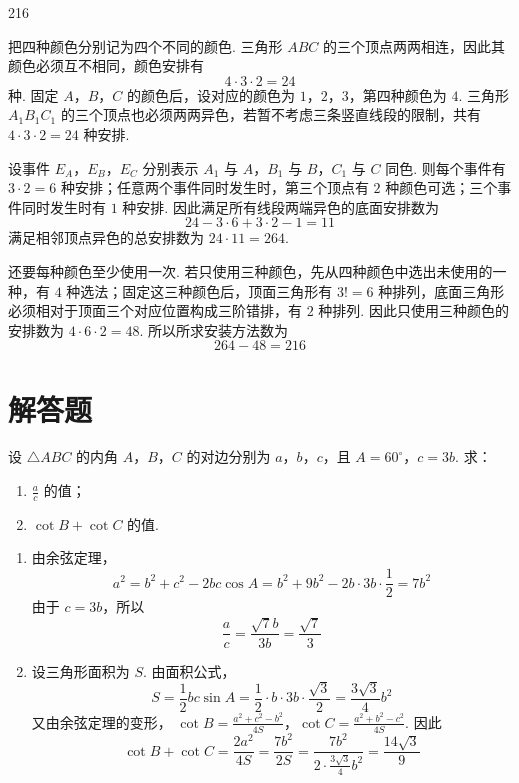 \begin{answer}
216
\end{answer}

\begin{solution}
把四种颜色分别记为四个不同的颜色. 三角形 \(ABC\) 的三个顶点两两相连，因此其颜色必须互不相同，颜色安排有
\[
4\cdot3\cdot2=24
\]
种. 固定 \(A\)，\(B\)，\(C\) 的颜色后，设对应的颜色为 \(1\)，\(2\)，\(3\)，第四种颜色为 \(4\). 三角形 \(A_{1}B_{1}C_{1}\) 的三个顶点也必须两两异色，若暂不考虑三条竖直线段的限制，共有 \(4\cdot3\cdot2=24\) 种安排.

设事件 \(E_{A}\)，\(E_{B}\)，\(E_{C}\) 分别表示 \(A_{1}\) 与 \(A\)，\(B_{1}\) 与 \(B\)，\(C_{1}\) 与 \(C\) 同色. 则每个事件有 \(3\cdot2=6\) 种安排；任意两个事件同时发生时，第三个顶点有 \(2\) 种颜色可选；三个事件同时发生时有 \(1\) 种安排. 因此满足所有线段两端异色的底面安排数为
\[
24-3\cdot6+3\cdot2-1=11
\]
满足相邻顶点异色的总安排数为 \(24\cdot11=264\).

还要每种颜色至少使用一次. 若只使用三种颜色，先从四种颜色中选出未使用的一种，有 \(4\) 种选法；固定这三种颜色后，顶面三角形有 \(3!=6\) 种排列，底面三角形必须相对于顶面三个对应位置构成三阶错排，有 \(2\) 种排列. 因此只使用三种颜色的安排数为 \(4\cdot6\cdot2=48\). 所以所求安装方法数为
\[
264-48=216
\]
\end{solution}

\section{解答题}

\begin{problem}
设 \(\triangle ABC\) 的内角 \(A\)，\(B\)，\(C\) 的对边分别为 \(a\)，\(b\)，\(c\)，且 \(A = 60^{\circ}\)，\(c = 3b\). 求：
\begin{enumerate}
\item \(\frac{a}{c}\) 的值；
\item \(\cot B + \cot C\) 的值.
\end{enumerate}
\end{problem}

\begin{solution}
\begin{enumerate}
\item 由余弦定理，
\[
a^{2}=b^{2}+c^{2}-2bc\cos A=b^{2}+9b^{2}-2b\cdot3b\cdot\frac{1}{2}=7b^{2}
\]
由于 \(c=3b\)，所以
\[
\frac{a}{c}=\frac{\sqrt{7}b}{3b}=\frac{\sqrt{7}}{3}
\]

\item 设三角形面积为 \(S\). 由面积公式，
\[
S=\frac{1}{2}bc\sin A=\frac{1}{2}\cdot b\cdot3b\cdot\frac{\sqrt{3}}{2}=\frac{3\sqrt{3}}{4}b^{2}
\]
又由余弦定理的变形，
\(\cot B=\frac{a^{2}+c^{2}-b^{2}}{4S}\)，\(\cot C=\frac{a^{2}+b^{2}-c^{2}}{4S}\).
因此
\[
\cot B+\cot C=\frac{2a^{2}}{4S}=\frac{7b^{2}}{2S}=\frac{7b^{2}}{2\cdot\frac{3\sqrt{3}}{4}b^{2}}=\frac{14\sqrt{3}}{9}
\]
\end{enumerate}
\end{solution}

